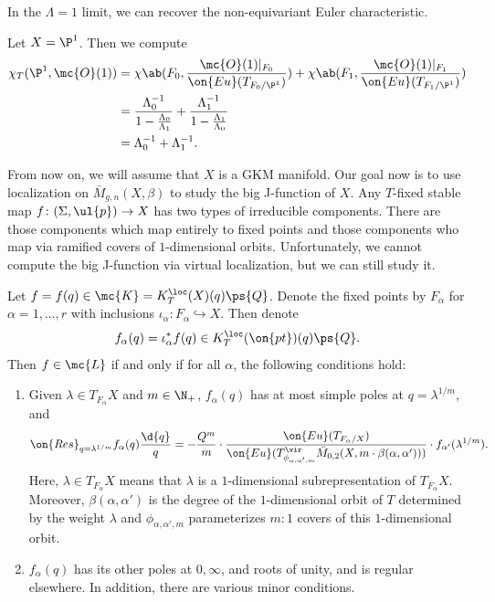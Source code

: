 \begin{rmk}
    In the \(\Lambda = 1\) limit, we can recover the non-equivariant Euler characteristic.
\end{rmk}

\begin{exm}
    Let \(X = \P^1\). Then we compute
    \begin{align*}
        \chi_T(\P^1, \mc{O}(1)) &= \chi\ab(F_0, \frac{\mc{O}(1)|_{F_0}}{\on{Eu}(T_{F_0/\P^1})}) + \chi\ab(F_1, \frac{\mc{O}(1)|_{F_1}}{\on{Eu}(T_{F_1/\P^1})}) \\
        &= \frac{\Lambda_0^{-1}}{1 - \frac{\Lambda_0}{\Lambda_1}} + \frac{\Lambda_1^{-1}}{1 - \frac{\Lambda_1}{\Lambda_0}} \\
        &= \Lambda_0^{-1} + \Lambda_1^{-1}. 
    \end{align*}
\end{exm}

From now on, we will assume that \(X\) is a GKM manifold. Our goal now is to use localization on \(\bar{M}_{g,n}(X, \beta)\)  to study the big J-function of \(X\). Any \(T\)-fixed stable map \(f \colon (\Sigma, \ul{p}) \to X\) has two types of irreducible components. There are those components which map entirely to fixed points and those components who map via ramified covers of \(1\)-dimensional orbits. Unfortunately, we cannot compute the big J-function via virtual localization, but we can still study it.

Let \(f = f(q) \in \mc{K} = K_T^{\loc}(X)(q)\ps{Q}\). Denote the fixed points by \(F_{\alpha}\) for \(\alpha = 1, \ldots, r\) with inclusions \(\iota_{\alpha} \colon F_{\alpha} \hookrightarrow X\). Then denote
\[ f_{\alpha}(q) = \iota_{\alpha}^* f(q) \in K_T^{\loc}(\on{pt})(q)\ps{Q}. \]
Then \(f \in \mc{L}\) if and only if for all \(\alpha\), the following conditions hold:
\begin{enumerate}
    \item Given \(\lambda \in T_{F_{\alpha}} X\) and \(m \in \N_+\), \(f_{\alpha}(q)\) has at most simple poles at \(q = \lambda^{1/m}\), and
        \[ \on{Res}_{q = \lambda^{1/m}} f_{\alpha}(q) \frac{\d{q}}{q} = -\frac{Q^m}{m} \cdot \frac{\on{Eu}(T_{F_{\alpha}/X})}{\on{Eu}(T^{\vir}_{\phi_{\alpha,\alpha',m}}\bar{M}_{0,2}(X, m \cdot \beta(\alpha, \alpha')))} \cdot f_{\alpha'}(\lambda^{1/m}). \]
        Here, \(\lambda \in T_{F_{\alpha}}X\) means that \(\lambda\) is a \(1\)-dimensional subrepresentation of \(T_{F_{\alpha}} X\). Moreover, \(\beta(\alpha,\alpha')\) is the degree of the \(1\)-dimensional orbit of \(T\) determined by the weight \(\lambda\) and \(\phi_{\alpha, \alpha', m}\) parameterizes \(m:1\) covers of this \(1\)-dimensional orbit.
    \item \(f_{\alpha}(q)\) has its other poles at \(0, \infty\), and roots of unity, and is regular elsewhere. In addition, there are various minor conditions.
\end{enumerate}

